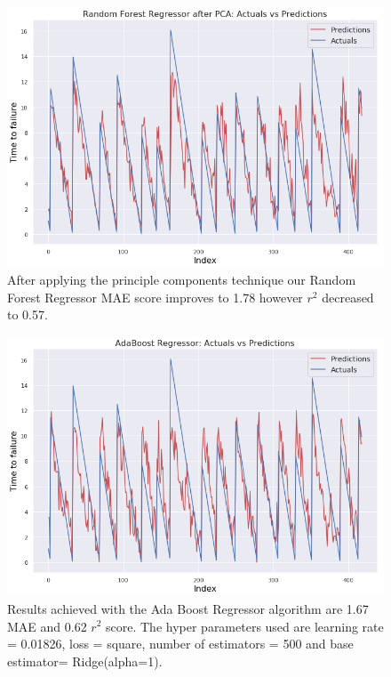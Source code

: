 \documentclass[]{llncs} %
\begin{document}
\begin{figure}
	\centering
	\includegraphics[width=.9\linewidth]{results1PCA}
	\caption{After applying the principle components technique our Random Forest Regressor MAE score improves to 1.78 however $r^2$ decreased to 0.57.}
	\label{fig:results1PCA}
\end{figure}

\begin{figure}[H]
	\centering
	\includegraphics[width=.9\linewidth]{results2}
	\caption{Results achieved with the Ada Boost Regressor algorithm are 1.67 MAE and 0.62 $r^2$ score. The hyper parameters used are learning rate = 0.01826, loss = square, number of estimators = 500 and base estimator= Ridge(alpha=1).}
	\label{fig:results2}
\end{figure}
\end{document}
